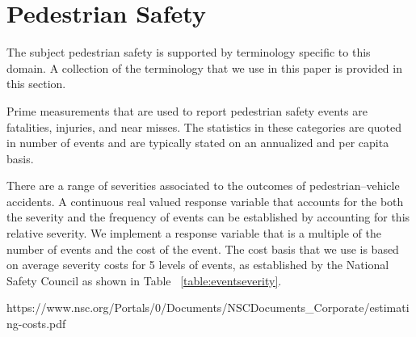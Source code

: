 \documentclass{llncs}
\begin{document}
\section{Pedestrian Safety}
%
The subject pedestrian safety is supported by terminology specific to this domain. A collection of the terminology that we use in this paper is provided in this section. 

Prime measurements that are used to report pedestrian safety events are fatalities, injuries, and near misses. The statistics in these categories are quoted in number of events and are typically stated on an annualized and per capita basis.

There are a range of severities associated to the outcomes of pedestrian--vehicle accidents. A continuous real valued response variable that accounts for the both the severity and the frequency of events can be established by accounting for this relative severity. We implement a response variable that is a multiple of the number of events and the cost of the event. The cost basis that we use is based on average severity costs for 5 levels of events, as established by the National Safety Council \cite{nsc2012estimating} as shown in Table ~\ref{table:eventseverity}.

https://www.nsc.org/Portals/0/Documents/NSCDocuments_Corporate/estimating-costs.pdf
\end{document}
